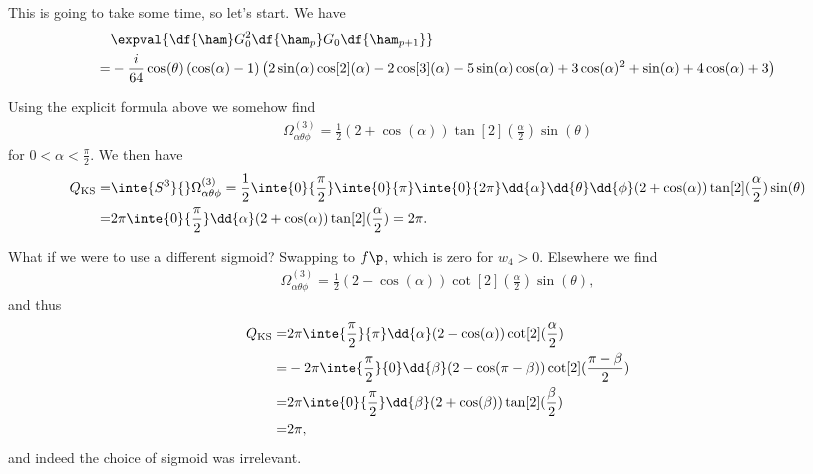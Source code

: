 This is going to take some time, so let's start. We have
\begin{align*}
	 &\expval{\df{\ham}G_{0}^{2}\df{\ham_{p}}G_{0}\df{\ham_{p + 1}}} \\
	=& -\frac{i}{64}\cos(\theta)\left(\cos(\alpha)-1\right) \left(2 \sin(\alpha)\cos[2](\alpha) - 2\cos[3](\alpha) - 5 \sin(\alpha)\cos(\alpha) + 3\cos(\alpha)^{2} + \sin(\alpha) + 4\cos(\alpha) + 3\right)
\end{align*}

Using the explicit formula above we somehow find
\begin{align*}
	\Omega^{(3)}_{\alpha\theta\phi} = \frac{1}{2}(2 + \cos(\alpha))\tan[2](\frac{\alpha}{2})\sin(\theta)
\end{align*}
for $0 < \alpha < \frac{\pi}{2}$. We then have
\begin{align*}
	Q_{\text{KS}} =& \inte{S^{3}}{}\Omega^{(3)}_{\alpha\theta\phi} = \frac{1}{2}\inte{0}{\frac{\pi}{2}}\inte{0}{\pi}\inte{0}{2\pi}\dd{\alpha}\dd{\theta}\dd{\phi}(2 + \cos(\alpha))\tan[2](\frac{\alpha}{2})\sin(\theta) \\
	              =& 2\pi\inte{0}{\frac{\pi}{2}}\dd{\alpha}(2 + \cos(\alpha))\tan[2](\frac{\alpha}{2}) = 2\pi.
\end{align*}

What if we were to use a different sigmoid? Swapping to $f\p$, which is zero for $w_{4} > 0$. Elsewhere we find
\begin{align*}
	\Omega^{(3)}_{\alpha\theta\phi} = \frac{1}{2}(2 - \cos(\alpha))\cot[2](\frac{\alpha}{2})\sin(\theta),
\end{align*}
and thus
\begin{align*}
	Q_{\text{KS}} =& 2\pi\inte{\frac{\pi}{2}}{\pi}\dd{\alpha}(2 - \cos(\alpha))\cot[2](\frac{\alpha}{2}) \\
	              =& -2\pi\inte{\frac{\pi}{2}}{0}\dd{\beta}(2 - \cos(\pi - \beta))\cot[2](\frac{\pi - \beta}{2}) \\
	              =& 2\pi\inte{0}{\frac{\pi}{2}}\dd{\beta}(2 + \cos(\beta))\tan[2](\frac{\beta}{2}) \\
	              =& 2\pi,
\end{align*}
and indeed the choice of sigmoid was irrelevant.

